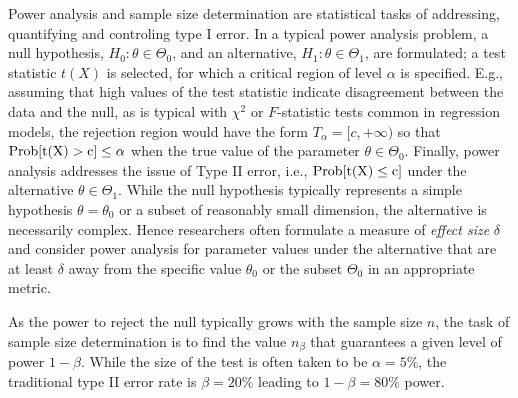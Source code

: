 \documentclass[11pt]{asaproc}
\begin{document}
Power analysis and sample size determination are statistical tasks of addressing,
quantifying and controling type I error. In a typical power analysis problem,
a null hypothesis, $H_0: \theta \in \Theta_0$, and an alternative, $H_1: \theta \in \Theta_1$,
are formulated; a test statistic $t(X)$ is selected, for which a critical region of level $\alpha$ is specified.
E.g., assuming that high values of the test statistic indicate disagreement between the data
and the null, as is typical with $\chi^2$ or $F$-statistic tests common in regression models,
the rejection region would have the form $T_\alpha = [c,+\infty)$ so that
$\rm{Prob} [t(X) > c] \le \alpha$ when the true value of the parameter $\theta \in \Theta_0$.
Finally, power analysis addresses the issue of Type II error, i.e., $\rm{Prob} [t(X)\le c]$ under
the alternative $\theta \in \Theta_1$. While the null hypothesis typically represents
a simple hypothesis $\theta=\theta_0$ or a subset of reasonably small dimension, the alternative
is necessarily complex. Hence researchers often formulate a measure of \textit{effect size}
$\delta$ and consider power analysis for parameter values under the alternative that are
at least $\delta$ away from the specific value $\theta_0$ or the subset $\Theta_0$ in an appropriate metric.

As the power to reject the null typically grows with the sample size $n$, the task
of sample size determination is to find the value $n_\beta$ that guarantees a given level
of power $1-\beta$. While the size of the test is often taken to be $\alpha=5\%$,
the traditional type II error rate is $\beta=20\%$ leading to $1-\beta=80\%$ power.
\end{document}
